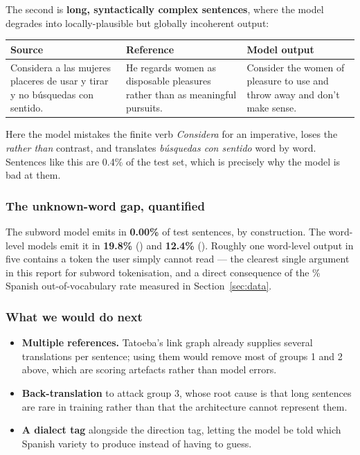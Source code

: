 \documentclass[11pt,a4paper]{article}
\begin{document}
The second is \textbf{long, syntactically complex sentences}, where the model
degrades into locally-plausible but globally incoherent output:

\begin{center}
\small
\begin{tabular}{@{}p{4.6cm}p{4.6cm}p{4.6cm}@{}}
\toprule
Source & Reference & Model output \\
\midrule
Considera a las mujeres placeres de usar y tirar y no búsquedas con sentido. &
He regards women as disposable pleasures rather than as meaningful pursuits. &
Consider the women of pleasure to use and throw away and don't make sense. \\
\bottomrule
\end{tabular}
\end{center}

Here the model mistakes the finite verb \emph{Considera} for an imperative,
loses the \emph{rather than} contrast, and translates \emph{búsquedas con
sentido} word by word. Sentences like this are 0.4\% of the test set, which is
precisely why the model is bad at them.

\subsubsection*{The unknown-word gap, quantified}

The subword model emits  in \textbf{0.00\%} of test sentences, by
construction. The word-level models emit it in \textbf{19.8\%} (\entos) and
\textbf{12.4\%} (\estoen). Roughly one word-level output in five contains a
token the user simply cannot read --- the clearest single argument in this
report for subword tokenisation, and a direct consequence of the
\OovEsPercent\% Spanish out-of-vocabulary rate measured in
Section~\ref{sec:data}.

\subsubsection*{What we would do next}

\begin{itemize}
  \item \textbf{Multiple references.} Tatoeba's link graph already supplies
    several translations per sentence; using them would remove most of groups
    1 and 2 above, which are scoring artefacts rather than model errors.
  \item \textbf{Back-translation} to attack group 3, whose root cause is that
    long sentences are rare in training rather than that the architecture
    cannot represent them.
  \item \textbf{A dialect tag} alongside the direction tag, letting the model be
    told which Spanish variety to produce instead of having to guess.
\end{itemize}
\end{document}
